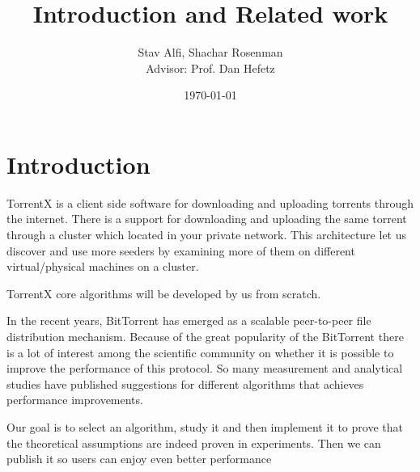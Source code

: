 \documentclass[11pt]{article}
\title{{\Huge   Introduction and Related work}}
\author{Stav Alfi, Shachar Rosenman\\{\small Advisor: Prof. Dan Hefetz}}
\date{\today}
\begin{document}
  \maketitle

  \section*{Introduction}
  \begin{flushleft}

    TorrentX is a client side software for downloading and uploading torrents through the internet.
    There is a support for downloading and uploading the same torrent through a cluster which located in your private network. This architecture let us discover and use more seeders by examining more of them on different virtual/physical machines on a cluster.

  \end{flushleft}
  \begin{flushleft}

    TorrentX core algorithms will be developed by us from scratch.

  \end{flushleft}
  \begin{flushleft}

    In the recent years, BitTorrent has emerged as a scalable peer-to-peer file distribution mechanism.
    Because of the great popularity of the BitTorrent there is a lot of interest among the scientific community on whether it is possible to improve the performance of this protocol.
    So many measurement and analytical studies have published suggestions for different algorithms that achieves performance improvements.

  \end{flushleft}
  \begin{flushleft}

    Our goal is to select an algorithm, study it and then implement it to prove that the theoretical assumptions are indeed proven in experiments. Then we can publish it so users can enjoy even better performance
  \end{flushleft}
\end{document}
